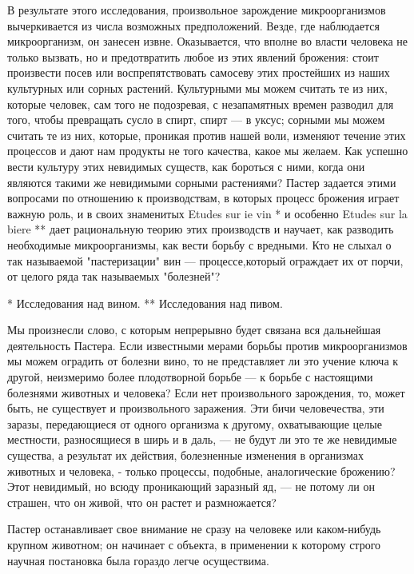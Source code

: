 В результате этого исследования, произвольное зарождение микроорганизмов
вычеркивается из числа возможных  предположений. Везде, где  наблюдается
микроорганизм, он  занесен  извне.  Оказывается, что  вполне  во  власти
человека не только  вызвать, но  и предотвратить любое  из этих  явлений
брожения: стоит  произвести посев  или воспрепятствовать  самосеву  этих
простейших из наших культурных или сорных растений. Культурными мы можем
считать  те  из  них,  которые  человек,  сам  того  не  подозревая,   с
незапамятных времен разводил для того,  чтобы превращать сусло в  спирт,
спирт --- в уксус; сорными мы  можем считать те из них, которые,  проникая
против нашей воли, изменяют течение  этих процессов и дают нам  продукты
не того  качества, какое  мы  желаем. Как  успешно вести  культуру  этих
невидимых существ, как  бороться с  ними, когда они  являются такими  же
невидимыми  сорными  растениями?  Пастер  задается  этими  вопросами  по
отношению к  производствам, в  которых  процесс брожения  играет  важную
роль, и в своих знаменитых Etudes sur ie vin * и особенно Etudes sur  la
biere **  дает  рациональную  теорию этих  производств  и  научает,  как
разводить необходимые микроорганизмы, как  вести борьбу с вредными.  Кто
не  слыхал  о  так  называемой  "пастеризации"  вин  ---  процессе,который
ограждает их от порчи, от целого ряда так называемых "болезней"?

* Исследования над вином.
** Исследования над пивом.

Мы произнесли слово, с которым  непрерывно будет связана вся  дальнейшая
деятельность   Пастера.   Если    известными   мерами   борьбы    против
микроорганизмов мы можем оградить от болезни вино, то не представляет ли
это учение  ключа к  другой, неизмеримо  более плодотворной  борьбе ---  к
борьбе  с   настоящими  болезнями   животных   и  человека?   Если   нет
произвольного зарождения, то, может быть, не существует и  произвольного
заражения. Эти  бичи человечества,  эти заразы,  передающиеся от  одного
организма к другому, охватывающие целые местности, разносящиеся в ширь и
в даль, ---  не будут  ли это  те же  невидимые существа,  а результат  их
действия, болезненные  изменения в  организмах  животных и  человека,  -
только процессы, подобные,  аналогические брожению?  Этот невидимый,  но
всюду проникающий заразный яд, --- не потому ли он страшен, что он  живой,
что он растет и размножается?

Пастер останавливает свое внимание не сразу на человеке или каком-нибудь
крупном животном; он начинает с объекта, в применении к которому  строго
научная постановка была гораздо легче осуществима.

